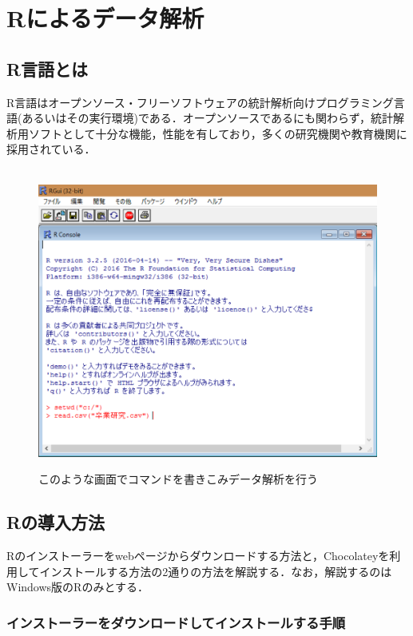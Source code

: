 \newpage
\section{Rによるデータ解析}

\subsection{R言語とは}

R言語はオープンソース・フリーソフトウェアの統計解析向けプログラミング言語(あるいはその実行環境)である．\cite{R}オープンソースであるにも関わらず，統計解析用ソフトとして十分な機能，性能を有しており，多くの研究機関や教育機関に採用されている．

\begin{figure}[htbp]
\centering　
\includegraphics[width=13cm]{r.png}
\caption{このような画面でコマンドを書きこみデータ解析を行う}
\end{figure}

\newpage
\subsection{Rの導入方法}

Rのインストーラーをwebページからダウンロードする方法と，Chocolateyを利用してインストールする方法の2通りの方法を解説する．なお，解説するのはWindows版のRのみとする．

\subsubsection{インストーラーをダウンロードしてインストールする手順}

